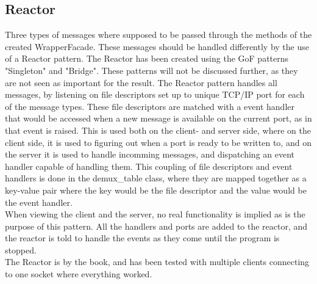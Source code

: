 \documentclass[Main]{subfiles}
\begin{document}
\subsection{Reactor}
Three types of messages where supposed to be passed through the methods of the created WrapperFacade. These messages should be handled differently by the use of a Reactor pattern. The Reactor has been created using the GoF patterns "Singleton" and "Bridge".
These patterns will not be discussed further, as they are not seen as important for the result.
The Reactor pattern handles all messages, by listening on file descriptors set up to unique TCP/IP port for each of the message types. These file descriptors are matched with a event handler that would be accessed when a new message is available on the current port, as in that event is raised.
This is used both on the client- and server side, where on the client side, it is used to figuring out when a port is ready to be written to, and on the server it is used to handle incomming messages, and dispatching an event handler capable of handling them. This coupling of file descriptors and event handlers is done in the demux\_table class, where they are mapped together as a key-value pair where the key would be the file descriptor and the value would be the event handler. \\
When viewing the client and the server, no real functionality is implied as is the purpose of this pattern. All the handlers and ports are added to the reactor, and the reactor is told to handle the events as they come until the program is stopped.\\
The Reactor is by the book, and has been tested with multiple clients connecting to one socket where everything worked. 
\end{document}
